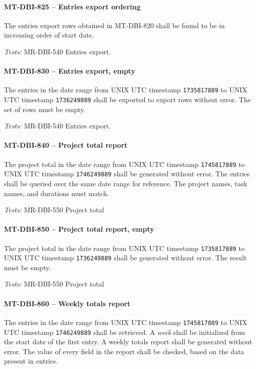 \paragraph{MT-DBI-825 -- Entries export ordering}
The entries export rows obtained in MT-DBI-820 shall be found to
be in increasing order of start date.

\textit{Tests: } MR-DBI-540 Entries export.

\paragraph{MT-DBI-830 -- Entries export, empty}
The entries in the date range from UNIX UTC timestamp
\lstinline{1735817889} to UNIX UTC timestamp \lstinline{1736249889}
shall be exported to export rows without error. The set of rows must be empty.

\textit{Tests: } MR-DBI-540 Entries export.

\paragraph{MT-DBI-840 -- Project total report}
The project total in the date range from UNIX UTC timestamp
\lstinline{1745817889} to UNIX UTC timestamp \lstinline{1746249889} shall be
generated without error.
The entries shall be queried over the same date range for reference.
The project names, task names, and durations must match.

\textit{Tests: } MR-DBI-550 Project total

\paragraph{MT-DBI-850 -- Project total report, empty}
The project total in the date range from UNIX UTC timestamp
\lstinline{1735817889} to UNIX UTC timestamp \lstinline{1736249889}
shall be generated without error. The result must be empty.

\textit{Tests: } MR-DBI-550 Project total

\paragraph{MT-DBI-860 -- Weekly totals report}
The entries in the date range from UNIX UTC timestamp \lstinline{1745817889} to
UNIX UTC timestamp \lstinline{1746249889} shall be retrieved.
A \emph{week} shall be initialized from the start date of the first entry.
A weekly totals report shall be generated without error.
The value of every field in the report shall be checked, based on the data
present in entries.

